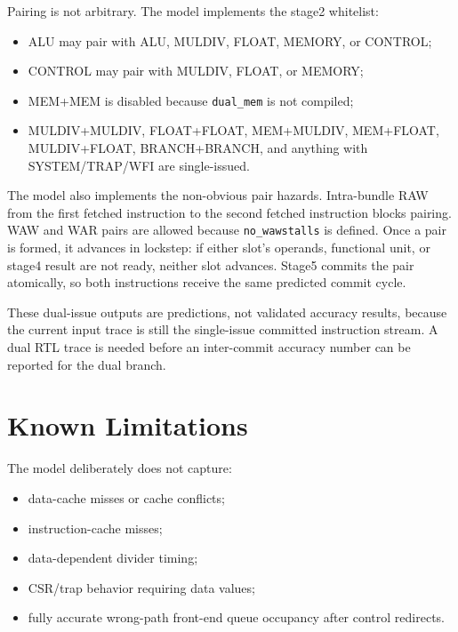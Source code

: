 \documentclass[11pt]{article}
\begin{document}
Pairing is not arbitrary. The model implements the stage2 whitelist:

\begin{itemize}
  \item ALU may pair with ALU, MULDIV, FLOAT, MEMORY, or CONTROL;
  \item CONTROL may pair with MULDIV, FLOAT, or MEMORY;
  \item MEM+MEM is disabled because \texttt{dual\_mem} is not compiled;
  \item MULDIV+MULDIV, FLOAT+FLOAT, MEM+MULDIV, MEM+FLOAT,
        MULDIV+FLOAT, BRANCH+BRANCH, and anything with SYSTEM/TRAP/WFI are
        single-issued.
\end{itemize}

The model also implements the non-obvious pair hazards. Intra-bundle RAW from
the first fetched instruction to the second fetched instruction blocks pairing.
WAW and WAR pairs are allowed because \texttt{no\_wawstalls} is defined. Once a
pair is formed, it advances in lockstep: if either slot's operands, functional
unit, or stage4 result are not ready, neither slot advances. Stage5 commits the
pair atomically, so both instructions receive the same predicted commit cycle.

These dual-issue outputs are predictions, not validated accuracy results,
because the current input trace is still the single-issue committed instruction
stream. A dual RTL trace is needed before an inter-commit accuracy number can be
reported for the dual branch.

\section{Known Limitations}

The model deliberately does not capture:

\begin{itemize}
  \item data-cache misses or cache conflicts;
  \item instruction-cache misses;
  \item data-dependent divider timing;
  \item CSR/trap behavior requiring data values;
  \item fully accurate wrong-path front-end queue occupancy after control
        redirects.
\end{itemize}
\end{document}
